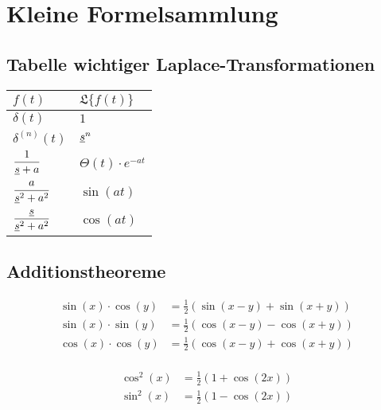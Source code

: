 \chapter{Kleine Formelsammlung}

\section{Tabelle wichtiger Laplace-Transformationen}
\begin{center}
\begin{tabular}{ll}
$f(t)$  & $\mathfrak{L}\{f(t)\}$\\
\midrule
$\delta(t)$ & $1$\\[1ex]
$\delta^{(n)}(t)$ & $\underline{s}^n$\\[1ex]
$\dfrac{1}{\underline{s}+a}$ & $\Theta(t)\cdot e^{-at}$\\[1ex]
$\dfrac{a}{\underline{s}^2+a^2}$ & $\sin(at)$\\[1ex]
$\dfrac{\underline{s}}{\underline{s}^2+a^2}$ & $\cos(at)$\\[1ex]
\end{tabular}
\end{center}

\section{Additionstheoreme}

\begin{align*}
  \sin(x)\cdot\cos(y) &= \frac{1}{2}(\sin(x-y)+\sin(x+y))\\
  \sin(x)\cdot\sin(y) &= \frac{1}{2}(\cos(x-y)-\cos(x+y))\\
  \cos(x)\cdot\cos(y) &= \frac{1}{2}(\cos(x-y)+\cos(x+y))\\
\end{align*}

\begin{align*}
  \cos^2(x) &= \frac{1}{2}(1+\cos(2x))\\
  \sin^2(x) &= \frac{1}{2}(1-\cos(2x))
\end{align*}
